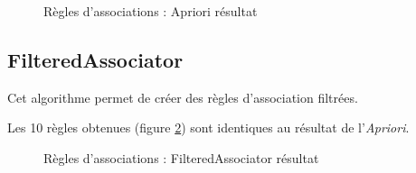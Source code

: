 \begin{figure}[H]
    \centering
    \caption{Règles d'associations : Apriori résultat}
    \label{apriori}
\end{figure}

\subsection{FilteredAssociator}

Cet algorithme permet de créer des règles d'association filtrées.

Les 10 règles obtenues (figure \ref{filtered}) sont identiques au résultat de l'\textit{Apriori}.

\begin{figure}[H]
    \centering
    \caption{Règles d'associations : FilteredAssociator résultat}
    \label{filtered}
\end{figure}
